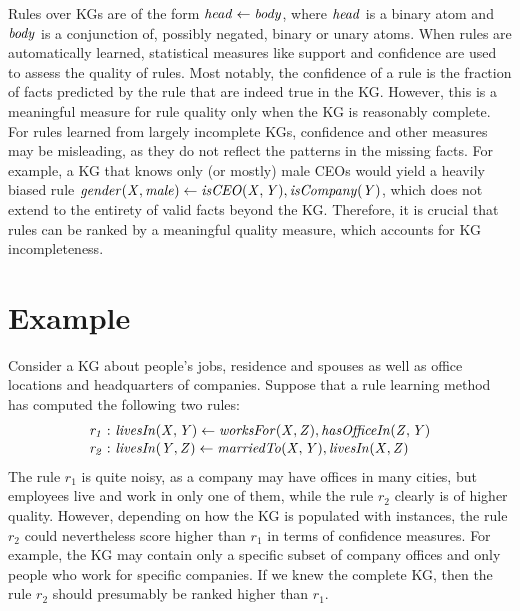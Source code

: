 Rules over KGs are of the form $\mathit{head \leftarrow body}$,
where $\mathit{head}$ is a binary atom and 
$\mathit{body}$ is a conjunction of, possibly negated, binary or unary atoms.
When rules are automatically learned, statistical measures like
support and confidence are used to assess the quality of rules.
Most notably, the confidence of a rule is the fraction of
facts predicted by the rule that are indeed true in the KG.
However, this is a meaningful measure for rule quality only
when the KG is reasonably complete.
For rules learned from largely incomplete KGs, confidence and
other measures may be misleading, as they do not reflect
the patterns in the missing facts.
For example, a KG that knows only (or mostly) male CEOs
would yield a heavily biased rule 
$\mathit{gender(X,male) \leftarrow isCEO(X,Y), isCompany(Y)}$, 
which does not
extend to the entirety of valid facts beyond the KG.
Therefore, it is crucial that rules can be ranked by a meaningful
quality measure, %
which accounts for %
KG incompleteness. %


%
\section{Example}
Consider a KG about people's jobs, residence and
spouses as well as office locations and headquarters of companies.
Suppose that a rule learning method has computed the following two rules:
{\small
\begin{align}
	\label{eq:ex-rule-1}
\mi{r_1 :\ }& \mi{livesIn(X,Y) \leftarrow worksFor(X,Z), hasOfficeIn(Z,Y)}\\[-.5ex]
	\label{eq:ex-rule-2}
\mi{r_2 :\ }& \mi{ livesIn(Y,Z) \leftarrow marriedTo(X,Y), livesIn(X,Z)}%
\end{align}}
The rule $r_1$ is quite noisy, as a company may have offices in many cities, %
but employees live and work in only one of them, while
the rule $r_2$ clearly is of higher quality. 
However, depending on how the KG is populated with instances,
the rule $r_2$ could nevertheless score higher than $r_1$ in terms of confidence
measures. 
For example, the KG may contain only a specific subset of company offices
and only people who work for specific companies. 
If we knew the complete KG, then the rule $r_2$
should presumably be ranked higher than $r_1$.

